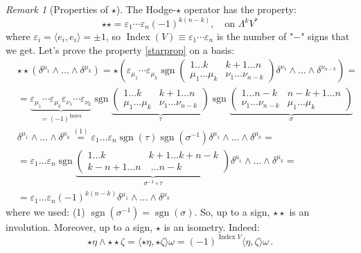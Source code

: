 \documentclass[a4paper,11pt,titlepage, article, oneside]{memoir}
\numberwithin{equation}{section}
\theoremstyle{definition}
\theoremstyle{remark}
\newtheorem{remark}[theorem]{Remark}
\DeclareMathOperator{\Index}{Index}
\DeclareMathOperator{\sgn}{sgn}
\begin{document}
\begin{remarkbox}\begin{remark}[Properties of $\star$]
The Hodge-$\star$ operator has the property:
\begin{equation} \label{starprop}
\star \star = \varepsilon_1 \cdots \varepsilon_n (-1)^{k(n-k)}, \quad \text{on } \Lambda^k V^*
\end{equation}
where $\varepsilon_i = \langle e_i, e_i \rangle = \pm 1$, so $\Index(V) \equiv \varepsilon_1 \cdots \varepsilon_n$ is the number of "$-$" signs that we get. Let's prove the property \eqref{starprop} on a basis:
\begin{align*}
& \star \star (\delta^{\mu_1} \wedge \ldots \wedge \delta^{\mu_k}) = \star \left ( \varepsilon_{\mu_1} \cdots \varepsilon_{\mu_k} \sgn \left(
\begin{matrix}
1\ldots k &k+1\ldots n \\
\mu_1\ldots \mu_k & \nu_1 \ldots \nu_{n-k}
\end{matrix}
\right)  \delta^{\nu_1} \wedge \ldots \wedge \delta^{\nu_{n-k}}\right) = \\
&= \underbrace{\varepsilon_{\mu_1} \cdots \varepsilon_{\mu_k} \varepsilon_{\nu_1} \cdots \varepsilon_{\nu_k}}_{=(-1)^{\Index}} \sgn \underbrace{ \left( 
\begin{matrix}
1\ldots k &k+1\ldots n \\
\mu_1\ldots \mu_k & \nu_1 \ldots \nu_{n-k}
\end{matrix}
\right)}_{\tau} \sgn \underbrace{ \left( 
\begin{matrix}
1\ldots n-k &n-k+1\ldots n \\
\nu_1 \ldots \nu_{n-k}& \mu_1 \ldots \mu_{k}
\end{matrix} 
\right)}_{\sigma} \\
& \delta^{\mu_1} \wedge \ldots \wedge \delta^{\mu_k} \overset{(1)}{=}  \varepsilon_1 \ldots \varepsilon_n \sgn (\tau) \sgn(\sigma^{-1}) \delta^{\mu_1} \wedge \ldots \wedge \delta^{\mu_k} = \\
&=  \varepsilon_1 \ldots \varepsilon_n \sgn \underbrace{ \left (
\begin{matrix}
1 \ldots k & k+1 \ldots k+n-k \\
k -n+1 \ldots n & \ \ldots n-k
\end{matrix} \right)
}_{\sigma^{-1} \circ \tau} \delta^{\mu_1} \wedge \ldots \wedge \delta^{\mu_k}  = \\
&= \varepsilon_1 \ldots \varepsilon_n (-1)^{k(n-k)} \delta^{\mu_1} \wedge \ldots \wedge \delta^{\mu_k}
\end{align*}
where we used: (1) $\sgn(\sigma^{-1}) = \sgn(\sigma)$. So, up to a sign, $\star \star$ is an involution. Moreover, up to a sign, $\star$ is an isometry. Indeed:
$$\star \eta \wedge \star \star \zeta = \langle \star \eta , \star \zeta \rangle \omega = (-1)^{\Index V} \langle \eta, \zeta \rangle \omega \, .$$
\end{remark}\end{remarkbox}
\end{document}
